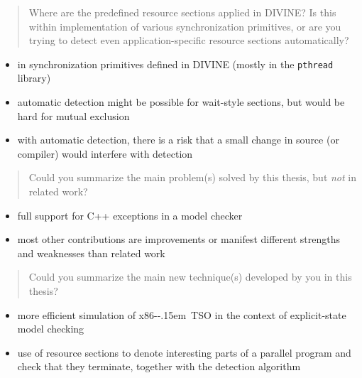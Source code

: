 \documentclass[aspectratio=169, fi]{paradise-slide}
\newcommand{\xtso}{\mbox{x86-\kern-.15em TSO}\xspace}
\newcommand{\rquote}[1]{\begin{quote}#1\end{quote}\bigskip\setlength{\leftmargini}{1em}}
\begin{document}
\begin{frame}[noframenumbering]{\qtitle}
  \rquote{Where are the predefined resource sections applied in DIVINE? Is this within
    implementation of various synchronization primitives, or are you trying to detect even
    application-specific resource sections automatically?}

  \begin{itemize}
    \item in synchronization primitives defined in DIVINE (mostly in the \texttt{pthread} library)
    \item automatic detection might be possible for wait-style sections, but would be hard for
      mutual exclusion
    \item with automatic detection, there is a risk that a small change in source (or compiler)
      would interfere with detection
  \end{itemize}
\end{frame}

\def\rname{prof. Jaco van de Pol}

\begin{frame}[noframenumbering]{\qtitle}
  \rquote{Could you summarize the main problem(s) solved by this thesis, but \emph{not} in related
    work?}
  \begin{itemize}
    \item full support for C++ exceptions in a model checker
    \item most other contributions are improvements or manifest different strengths and weaknesses
      than related work
  \end{itemize}
\end{frame}

\begin{frame}[noframenumbering]{\qtitle}
  \rquote{Could you summarize the main new technique(s) developed by you in this thesis?}
  \begin{itemize}
    \item more efficient simulation of \xtso in the context of explicit-state model checking
    \medskip
    \item use of resource sections to denote interesting parts of a parallel program and check that
      they terminate, together with the detection algorithm
  \end{itemize}
\end{frame}
\end{document}
